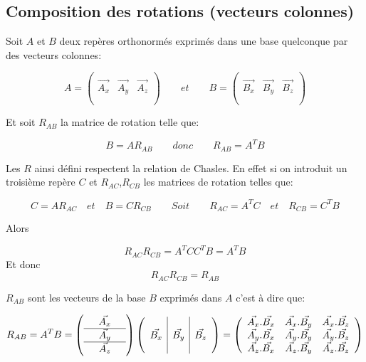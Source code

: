 \documentclass[12pt,a4paper]{article}
\begin{document}
	\newpage
	\subsection{Composition des rotations (vecteurs colonnes)}
	
	Soit $A$ et $B$ deux repères orthonormés exprimés dans une base quelconque par des vecteurs colonnes:
	
	\[
		A=\left(\begin{array}{c|c|c}
		&&\\
		\vec{A_x}&\vec{A_y}&\vec{A_z}\\
		&&\\
		\end{array}
		\right)		
		\qquad 
		et
		\qquad
		B=\left(\begin{array}{c|c|c}
		&&\\
		\vec{B_x}&\vec{B_y}&\vec{B_z}\\
		&&\\
		\end{array}
		\right)
	\]
	
	
	Et soit $R_{AB}$ la matrice de rotation telle que:
	
	\[
	\boxed{B=A R_{AB}} \quad \quad donc \quad \quad \boxed{R_{AB}=A^TB}
	\]
	
	Les $R$ ainsi défini respectent la relation de Chasles. En effet si on introduit un troisième repère $C$ et $R_{AC}$,$R_{CB}$ les matrices de rotation telles que:
	
	\[
	C=A R_{AC}\quad et \quad B=C R_{CB}  \quad\quad Soit\quad \quad R_{AC}=A^TC \quad et\quad  R_{CB}=C^TB
	\]
	
	Alors 
	
	\[
	R_{AC}R_{CB}=A^TC C^TB = A^TB
	\]
	Et donc 
	\[
	\boxed{R_{AC}R_{CB}=R_{AB}}
	\]
	
	$R_{AB}$ sont les vecteurs de la base $B$ exprimés dans $A$ c'est à dire que:
	
	\[
		R_{AB}=A^TB=
		\left(\begin{array}{ccc}
		&\vec{A_x}&\\
		\hline
		&\vec{A_y}&\\
		\hline
		&\vec{A_z}&\\
		\end{array}
		\right)
		\left(\begin{array}{c|c|c}
		&&\\
		\vec{B_x}&\vec{B_y}&\vec{B_z}\\
		&&\\
		\end{array}
		\right)
		=
		\left(\begin{array}{ccc}
		\vec{A_x}.\vec{B_x}&\vec{A_x}.\vec{B_y}&\vec{A_x}.\vec{B_z}\\
		\vec{A_y}.\vec{B_x}&\vec{A_y}.\vec{B_y}&\vec{A_y}.\vec{B_z}\\
		\vec{A_z}.\vec{B_x}&\vec{A_z}.\vec{B_y}&\vec{A_z}.\vec{B_z}\\
		\end{array}
		\right)
	\]
	
\end{document}
